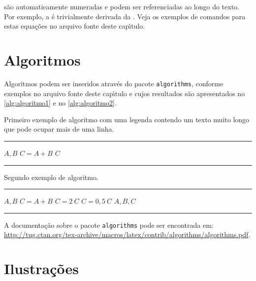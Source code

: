 \noindent s\~ao automaticamente numeradas e podem ser referenciadas ao longo do texto. Por exemplo, a  \'e trivialmente derivada da . Veja os exemplos de comandos para estas equa\c{c}\~oes no arquivo fonte deste cap\'{\i}tulo.

\section{Algoritmos}\label{sec:algoritmos}

Algoritmos podem ser inseridos atrav\'es do pacote \texttt{algorithms}, conforme exemplos no arquivo fonte deste cap\'{\i}tulo e cujos resultados s\~ao apresentados no \autoref{alg:algoritmo1} e no \autoref{alg:algoritmo2}.

\begin{algorithm}[Htb]%
\caption{Primeiro exemplo de algoritmo com uma legenda contendo um texto muito longo que pode ocupar mais de uma linha.}%
\label{alg:algoritmo1}%
\hrule
\begin{algorithmic}[1]%
\ENSURE $A, B$
\STATE $C = A + B$
\PRINT $C$
\end{algorithmic}
\hrule
{}%
\end{algorithm}

\begin{algorithm}[Htb]%
\caption{Segundo exemplo de algoritmo.}%
\label{alg:algoritmo2}%
\hrule
\begin{algorithmic}[1]%
\ENSURE $A, B$
\STATE $C = A + B$
\STATE $C = 2 \ C$
\ELSE
\STATE $C = 0,5 \ C$
\ENDIF
\PRINT $A, B, C$
\end{algorithmic}
\hrule
{}%
\end{algorithm}

A documenta\c{c}\~ao sobre o pacote \texttt{algorithms} pode ser encontrada em: \url{http://tug.ctan.org/tex-archive/macros/latex/contrib/algorithms/algorithms.pdf}.

\section{Ilustra\c{c}\~oes}\label{sec:ilustracoes}

